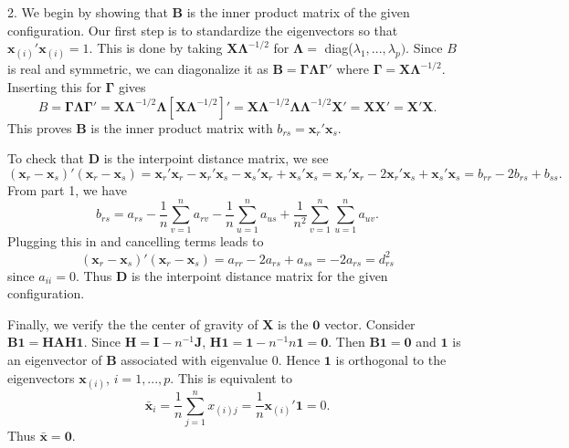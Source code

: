 \documentclass[10pt]{article} %
\def\A{\mathbf{A}}
\def\B{\mathbf{B}}
\def\D{\mathbf{D}}
\def\H{\mathbf{H}}
\def\I{\mathbf{I}}
\def\J{\mathbf{J}}
\def\1{\mathbf{1}}
\def\x{\mathbf{x}}
\def\X{\mathbf{X}}
\def\Gammamat{\mathbf{\Gamma}}
\def\Lambdamat{\mathbf{\Lambda}}
\begin{document}
2. We begin by showing that $\B$ is the inner product matrix of the given configuration. Our first step is to standardize the eigenvectors so that $\x_{(i)}'\x_{(i)}=1$. This is done by taking $\X \Lambdamat^{-1/2}$ for $\Lambdamat =$ diag($\lambda_1, ..., \lambda_p)$. Since $B$ is real and symmetric, we can diagonalize it as $\B = \Gammamat \Lambdamat \Gammamat'$ where $\Gammamat = \X \Lambdamat^{-1/2}$. Inserting this for $\Gammamat$ gives
\[ B = \Gammamat \Lambdamat \Gammamat' = \X \Lambdamat^{-1/2} \Lambdamat [\X \Lambdamat^{-1/2}]' 
= \X \Lambdamat^{-1/2} \Lambdamat \Lambdamat^{-1/2} \X' = \X\X' = \X'\X. \] This proves $\B$ is the inner product matrix with $b_{rs}=\x_r'\x_s.$

To check that $\D$ is the interpoint distance matrix, we see
\[ (\x_r-\x_s)'(\x_r-\x_s) = \x_r'\x_r-\x_r'\x_s-\x_s'\x_r+\x_s'\x_s = \x_r'\x_r-2\x_r'\x_s+\x_s'\x_s = b_{rr}-2b_{rs}+b_{ss}. \]
From part 1, we have 
\[ b_{rs} = a_{rs}-\frac{1}{n} \sum_{v=1}^n a_{rv} - \frac{1}{n} \sum_{u=1}^n a_{us}+\frac{1}{n^2} \sum_{v=1}^n \sum_{u=1}^n a_{uv}. \] Plugging this in and cancelling terms leads to
\[ (\x_r-\x_s)'(\x_r-\x_s) = a_{rr}-2a_{rs}+a_{ss} = -2a_{rs}=d_{rs}^2 \] since $a_{ii}=0$. Thus $\D$ is the interpoint distance matrix for the given configuration.

Finally, we verify the the center of gravity of $\X$ is the $\mathbf{0}$ vector. Consider $\B \1 = \H \A \H \1$. Since $\H = \I-n^{-1}\J$, $\H \1=\1-n^{-1}n\1=\mathbf{0}$. Then $\B \1 = \mathbf{0}$ and $\1$ is an eigenvector of $\B$ associated with eigenvalue $0$. Hence $\1$ is orthogonal to the eigenvectors $\x_{(i)}$, $i=1,...,p$. This is equivalent to
\[\bar{\mathbf{x}}_i = \frac{1}{n}\sum_{j=1}^n x_{(i)j} = \frac{1}{n} \x_{(i)}'\1  = 0 .\] Thus $\bar{\mathbf{x}} = \mathbf{0}$.
\end{document}
